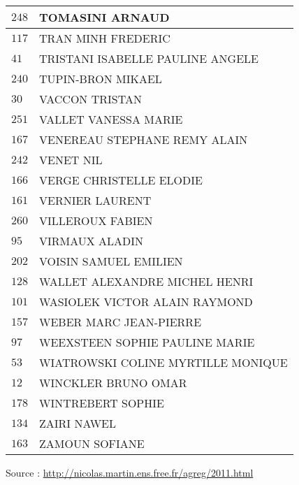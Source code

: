 \begin{xltabular}{\linewidth}{|l|X|}
    $248$ & TOMASINI ARNAUD \\
    \hline
    $117$ & TRAN MINH FREDERIC \\
    \hline
    $41$ & TRISTANI ISABELLE PAULINE ANGELE \\
    \hline
    $240$ & TUPIN-BRON MIKAEL \\
    \hline
    $30$ & VACCON TRISTAN \\
    \hline
    $251$ & VALLET VANESSA MARIE \\
    \hline
    $167$ & VENEREAU STEPHANE REMY ALAIN \\
    \hline
    $242$ & VENET NIL \\
    \hline
    $166$ & VERGE CHRISTELLE ELODIE \\
    \hline
    $161$ & VERNIER LAURENT \\
    \hline
    $260$ & VILLEROUX FABIEN \\
    \hline
    $95$ & VIRMAUX ALADIN \\
    \hline
    $202$ & VOISIN SAMUEL EMILIEN \\
    \hline
    $128$ & WALLET ALEXANDRE MICHEL HENRI \\
    \hline
    $101$ & WASIOLEK VICTOR ALAIN RAYMOND \\
    \hline
    $157$ & WEBER MARC JEAN-PIERRE \\
    \hline
    $97$ & WEEXSTEEN SOPHIE PAULINE MARIE \\
    \hline
    $53$ & WIATROWSKI COLINE MYRTILLE MONIQUE \\
    \hline
    $12$ & WINCKLER BRUNO OMAR \\
    \hline
    $178$ & WINTREBERT SOPHIE \\
    \hline
    $134$ & ZAIRI NAWEL \\
    \hline
    $163$ & ZAMOUN SOFIANE \\
    \hline
  \end{xltabular}

  \begin{flushright}
    {\tiny Source : \url{http://nicolas.martin.ens.free.fr/agreg/2011.html}}
  \end{flushright}

